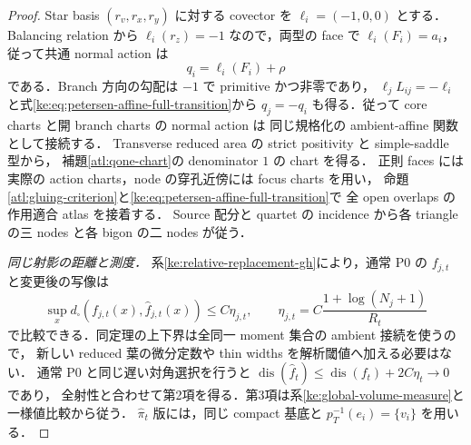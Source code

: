 \begin{proof}
Star basis $(r_v,r_x,r_y)$ に対する covector を $\ell_i=(-1,0,0)$ とする．
Balancing relation から $\ell_i(r_z)=-1$ なので，両型の face で
$\ell_i(F_i)=a_i$，従って共通 normal action は
\[
 q_i=\ell_i(F_i)+\rho
\]
である．Branch 方向の勾配は $-1$ で primitive かつ非零であり，
$\ell_jL_{ij}=-\ell_i$ と式\eqref{ke:eq:petersen-affine-full-transition}から
$q_j=-q_i$ も得る．従って core charts と開 branch charts の normal action は
同じ規格化の ambient-affine 関数として接続する．
Transverse reduced area の strict positivity と simple-saddle 型から，
補題\ref{atl:qone-chart}の denominator $1$ の chart を得る．
正則 faces には実際の action charts，node の穿孔近傍には focus charts を用い，
命題\ref{atl:gluing-criterion}と\eqref{ke:eq:petersen-affine-full-transition}で
全 open overlaps の作用適合 atlas を接着する．
Source 配分と quartet の incidence から各 triangle の三 nodes と各 bigon の二 nodes が従う．

\emph{同じ射影の距離と測度．}
系\ref{ke:relative-replacement-gh}により，通常 P0 の $f_{j,t}$ と変更後の写像は
\[
 \sup_x d_\square(f_{j,t}(x),\widehat f_{j,t}(x))
       \le C\eta_{j,t},\qquad
 \eta_{j,t}=C\frac{1+\log(N_j+1)}{R_t}
\]
で比較できる．同定理の上下界は全同一 moment 集合の ambient 接続を使うので，
新しい reduced 葉の微分定数や thin widths を解析閾値へ加える必要はない．
通常 P0 と同じ遅い対角選択を行うと
$\operatorname{dis}(\widehat f_t)\le\operatorname{dis}(f_t)+2C\eta_t\to0$ であり，
全射性と合わせて第2項を得る．第3項は系\ref{ke:global-volume-measure}と一様値比較から従う．
$\widehat\pi_t$ 版には，同じ compact 基底と $p_T^{-1}(e_i)=\{v_i\}$ を用いる．
\end{proof}
